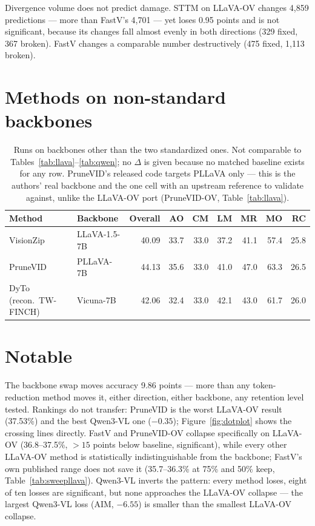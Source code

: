 \documentclass[11pt]{article}
\begin{document}
Divergence volume does not predict damage. STTM on LLaVA-OV changes 4{,}859
predictions --- more than FastV's 4{,}701 --- yet loses 0.95 points and is
not significant, because its changes fall almost evenly in both directions
(329 fixed, 367 broken). FastV changes a comparable number destructively
(475 fixed, 1{,}113 broken).

\section{Methods on non-standard backbones}
\label{sec:native}

\begin{table}[H]
  \centering
  \small
  \caption{Runs on backbones other than the two standardized ones. Not
  comparable to Tables~\ref{tab:llava}--\ref{tab:qwen}; no $\Delta$ is given
  because no matched baseline exists for any row. PruneVID's released code
  targets PLLaVA only --- this is the authors' real backbone and the one
  cell with an upstream reference to validate against, unlike the LLaVA-OV
  port (PruneVID-OV, Table~\ref{tab:llava}).}
  \label{tab:native}
  \begin{tabular}{llrrrrrrr}
    \toprule
    Method & Backbone & Overall & AO & CM & LM & MR & MO & RC \\
    \midrule
    VisionZip & LLaVA-1.5-7B & 40.09 & 33.7 & 33.0 & 37.2 & 41.1 & 57.4 & 25.8 \\
    PruneVID & PLLaVA-7B & 44.13 & 35.6 & 33.0 & 41.0 & 47.0 & 63.3 & 26.5 \\
    DyTo (recon.\ TW-FINCH) & Vicuna-7B & 42.06 & 32.4 & 33.0 & 42.1 & 43.0 & 61.7 & 26.0 \\
    \bottomrule
  \end{tabular}
\end{table}

\section{Notable}
\label{sec:notable}

The backbone swap moves accuracy 9.86 points --- more than any
token-reduction method moves it, either direction, either backbone, any
retention level tested. Rankings do not transfer: PruneVID is the worst
LLaVA-OV result (37.53\%) and the best Qwen3-VL one ($-0.35$);
Figure~\ref{fig:dotplot} shows the crossing lines directly. FastV and
PruneVID-OV collapse specifically on LLaVA-OV (36.8--37.5\%, $>15$ points
below baseline, significant), while every other LLaVA-OV method is statistically
indistinguishable from the backbone; FastV's own published range does not
save it (35.7--36.3\% at 75\% and 50\% keep, Table~\ref{tab:sweepllava}).
Qwen3-VL inverts the pattern: every method loses, eight of ten losses are
significant, but none approaches the LLaVA-OV collapse --- the largest
Qwen3-VL loss (AIM, $-6.55$) is smaller than the smallest LLaVA-OV collapse.
\end{document}
